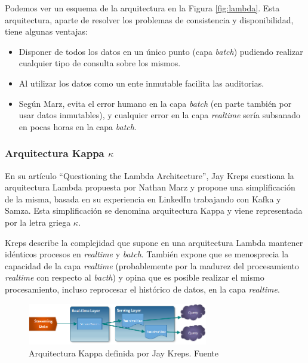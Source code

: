 Podemos ver un esquema de la arquitectura en la Figura \ref{fig:lambda}. Esta arquitectura, aparte de resolver los problemas de consistencia y disponibilidad, tiene algunas ventajas:

\begin{itemize}
	
	\item Disponer de todos los datos en un único punto (capa \textit{batch}) pudiendo realizar cualquier tipo de consulta sobre los mismos. 
	\item Al utilizar los datos como un ente inmutable facilita las auditorias. 
	\item Según Marz, evita el error humano en la capa \textit{batch} (en parte también por usar datos inmutables), y cualquier error en la capa \textit{realtime} sería subsanado en pocas horas en la capa \textit{batch}.

\end{itemize}


\subsubsection{Arquitectura Kappa $\kappa$}  
En su artículo ``Questioning the Lambda Architecture''\cite{kappa}, Jay Kreps cuestiona la arquitectura Lambda propuesta por Nathan Marz y propone una simplificación de la misma, basada en su experiencia en LinkedIn trabajando con Kafka y Samza. Esta simplificación se denomina arquitectura Kappa y viene representada por la letra griega $\kappa$.


Kreps describe la complejidad que supone en una arquitectura Lambda mantener idénticos procesos en \textit{realtime} y \textit{batch}. También expone que se menosprecia la capacidad de la capa \textit{realtime} (probablemente por la madurez del procesamiento \textit{realtime} con respecto al \textit{bacth}) y opina que es posible realizar el mismo procesamiento, incluso reprocesar el histórico de datos, en la capa \textit{realtime}. 

\begin{figure}[!ht]
	\centering
	\includegraphics[width=0.70\textwidth]{images/arte/kappa}
	\caption{Arquitectura Kappa definida por Jay Kreps. Fuente \cite{lambdakappa}}
	\label{fig:kappa}
\end{figure}

